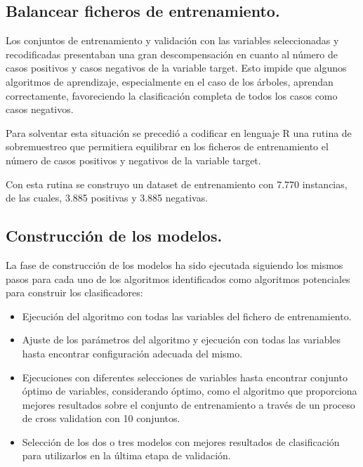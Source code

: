 \subsection{Balancear ficheros de entrenamiento.}

Los conjuntos de entrenamiento y validación con las variables seleccionadas y recodificadas presentaban una gran descompensación en cuanto al número de casos positivos y casos negativos de la variable target. Esto impide que algunos algoritmos de aprendizaje, especialmente en el caso de los árboles, aprendan correctamente, favoreciendo la clasificación completa de todos los casos como casos negativos. 

Para solventar esta situación se precedió a codificar en lenguaje R una rutina de sobremuestreo que permitiera equilibrar en los ficheros de entrenamiento el número de casos positivos y negativos de la variable target.

Con esta rutina se construyo un dataset de entrenamiento con 7.770 instancias, de las cuales, 3.885 positivas y 3.885 negativas.

\subsection{Construcción de los modelos.}

La fase de construcción de los modelos ha sido ejecutada siguiendo los mismos pasos para cada uno de los algoritmos identificados como algoritmos potenciales para construir los clasificadores:

\begin{itemize}

\item{Ejecución del algoritmo con todas las variables del fichero de entrenamiento.}
\item{Ajuste de los parámetros del algoritmo y ejecución con todas las variables hasta encontrar configuración adecuada del mismo.}
\item{Ejecuciones con diferentes selecciones de variables hasta encontrar conjunto óptimo de variables, considerando óptimo, como el algoritmo que proporciona mejores resultados sobre el conjunto de entrenamiento a través de un proceso de cross validation con 10 conjuntos.}
\item{Selección de los dos o tres modelos con mejores resultados de clasificación para utilizarlos en la última etapa de validación.}

\end{itemize}

